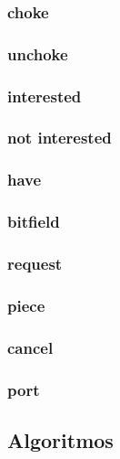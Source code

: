 \subsubsection*{choke}
\subsubsection*{unchoke}
\subsubsection*{interested}
\subsubsection*{not interested}
\subsubsection*{have}
\subsubsection*{bitfield}
\subsubsection*{request}
\subsubsection*{piece}
\subsubsection*{cancel}
\subsubsection*{port}


\subsection*{Algoritmos}